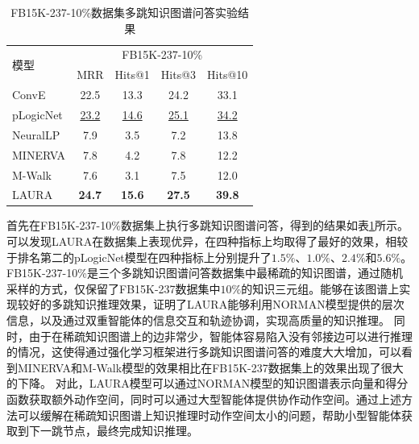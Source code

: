 \documentclass[algorithmlist, AutoFakeBold, AutoFakeSlant, figurelist, tablelist, nomlist, engineering]{seuthesix}
\begin{document}
\begin{table}[t]
  \centering
  \caption{FB15K-237-10\%数据集多跳知识图谱问答实验结果}
  \begin{tabular*}{0.95\textwidth}{@{\extracolsep{\fill}}lcccc}
    \toprule[1pt]
    \multirow{2}{*}{模型} & \multicolumn{4}{c}{FB15K-237-10\%}   \\
      & MRR & Hits@1 & Hits@3 & Hits@10 \\ \hline
    ConvE & 22.5 & 13.3 & 24.2 & 33.1 \\
    pLogicNet & \underline{23.2} & \underline{14.6} & \underline{25.1} & \underline{34.2} \\
    NeuralLP & 7.9 & 3.5 & 7.2 & 13.8 \\
    MINERVA & 7.8 & 4.2 & 7.8 & 12.2 \\
    M-Walk & 7.6 & 3.1 & 7.5 & 12.0 \\
    LAURA & \textbf{24.7} & \textbf{15.6} & \textbf{27.5} & \textbf{39.8} \\
    \bottomrule[1pt]
  \end{tabular*}
  \label{Experiment2_FB15K-237-10}
\end{table}
首先在FB15K-237-10\%数据集上执行多跳知识图谱问答，得到的结果如表\ref{Experiment2_FB15K-237-10}所示。
可以发现LAURA在数据集上表现优异，在四种指标上均取得了最好的效果，相较于排名第二的pLogicNet模型在四种指标上分别提升了$1.5\%$、$1.0\%$、$2.4\%$和$5.6\%$。
FB15K-237-10\%是三个多跳知识图谱问答数据集中最稀疏的知识图谱，通过随机采样的方式，仅保留了FB15K-237数据集中$10\%$的知识三元组。能够在该图谱上实现较好的多跳知识推理效果，证明了LAURA能够利用NORMAN模型提供的层次信息，以及通过双重智能体的信息交互和轨迹协调，实现高质量的知识推理。
同时，由于在稀疏知识图谱上的边非常少，智能体容易陷入没有邻接边可以进行推理的情况，这使得通过强化学习框架进行多跳知识图谱问答的难度大大增加，可以看到MINERVA和M-Walk模型的效果相比在FB15K-237数据集上的效果出现了很大的下降。
对此，LAURA模型可以通过NORMAN模型的知识图谱表示向量和得分函数获取额外动作空间，同时可以通过大型智能体提供协作动作空间。通过上述方法可以缓解在稀疏知识图谱上知识推理时动作空间太小的问题，帮助小型智能体获取到下一跳节点，最终完成知识推理。
\end{document}
